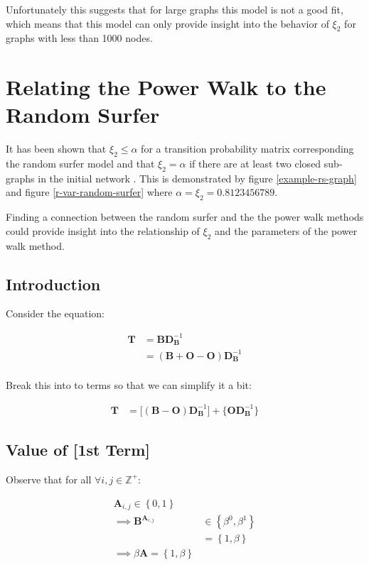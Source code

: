 \documentclass[11pt, twoside]{report}
\begin{document}
Unfortunately this suggests that for large graphs this model is not a good fit,
which means that this model can only provide insight into the behavior of
\(\xi_{2}\) for graphs with less than 1000 nodes.

\section{Relating the Power Walk to the Random Surfer}
\label{relate-to-random-surfer}
It has been shown that \(\xi_{2} \leq \alpha\) for a transition probability matrix corresponding the random surfer model and that \(\xi_{2} = \alpha\) if there are at least two closed sub-graphs in the initial network \cite{haveliwalaSecondEigenvalueGoogle2003}. This is demonstrated by figure \ref{example-rs-graph} and figure \ref{r-var-random-surfer} where \(\alpha = \xi_{2} = 0.8123456789\).

Finding a connection between the random surfer and the the power walk methods could provide insight into the relationship of \(\xi_{2}\) and the parameters of the power walk method.

\subsection{Introduction}
\label{sec:org07b66b7}
Consider the equation:


\begin{align*}
\mathbf{T}&= \mathbf{B}\mathbf{D}_{\mathbf{B}}^{- 1} \\
&= \left( \mathbf{B}+  \mathbf{O} - \mathbf{O} \right) \mathbf{D}_{\mathbf{B}}^{- 1} \\
\end{align*}


Break this into to terms so that we can simplify it a bit:


\begin{align*}
    \mathbf{T} &= \Bigg[ \left( \mathbf{B}- \mathbf{O} \right)\mathbf{D}_{\mathbf{B}}^{- 1} \Bigg] + \Bigg\{  \mathbf{O}\mathbf{D}_{\mathbf{B}}^{- 1} \Bigg\}
\end{align*}
\subsection{Value of [1st Term]}
\label{value-of-1st-term}
Observe that for all \(\forall i,j\in \mathbb{Z}^+\):


\begin{align*}
\mathbf{A}_{i, j} \in \left\{0, 1\right\} \\
\implies  \mathbf{B}^{\mathbf{A}_{i, j}} &\in \left\{\beta^0, \beta^1\right\} \\
                     &= \left\{1, \beta \right\}  \\
                      \implies  \beta \mathbf{A} = \left\{1, \beta \right\}
\end{align*}
\end{document}
